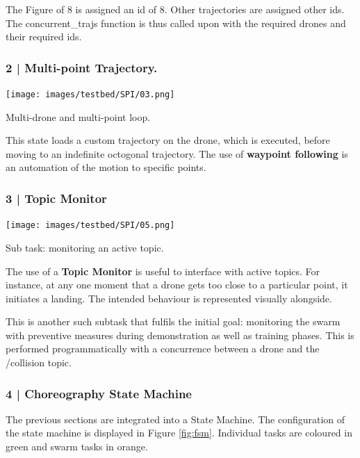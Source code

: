 The Figure of 8 is assigned an id of 8. Other trajectories are assigned other ids. The concurrent\_trajs function is thus called upon with the required drones and their required ids.

\subsubsection{2 | Multi-point Trajectory.}


\begin{marginfigure}
    \hspace{0.5cm}
    \texttt{[image: images/testbed/SPI/03.png]}
    \caption{Multi-drone and multi-point loop.}
    \label{diagram:choreography_trajectories}
\end{marginfigure}

This state loads a custom trajectory on the drone, which is executed, before moving to an indefinite octogonal trajectory. The use of \textbf{waypoint following} is an automation of the motion to specific points. 


\subsubsection{3 | Topic Monitor}

\begin{marginfigure}%
    \texttt{[image: images/testbed/SPI/05.png]}
    \caption{Sub task: monitoring an active topic.}
    \label{diagram:monitor_in_trajectory}
\end{marginfigure}

The use of a \textbf{Topic Monitor} is useful to interface with active topics. For instance, at any one moment that a drone gets too close to a particular point, it initiates a landing. The intended behaviour is represented visually alongside.

This is another such subtask that fulfils the initial goal: monitoring the swarm with preventive measures during demonstration as well as training phases. This is performed programmatically with a concurrence between a drone and the /collision topic. 


\subsubsection{4 | Choreography State Machine}

The previous sections are integrated into a State Machine. The configuration of the state machine is displayed in Figure \ref{fig:fsm}. Individual tasks are coloured in green and swarm tasks in orange.


